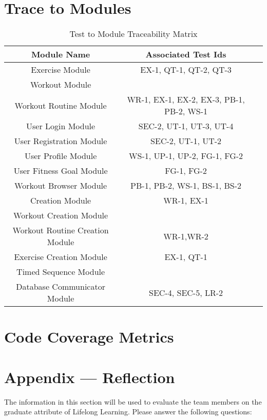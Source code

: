 \documentclass[12pt, titlepage]{article}
\begin{document}
\section{Trace to Modules}		
\begin{table}[H]
	\begin{tabular}{|c|c|c|}
		\hline
		\textbf{Module Name} & \textbf{Associated Test Ids}\\ \hline
		Exercise Module & EX-1, QT-1, QT-2, QT-3  \\\hline
		Workout Module & \\\hline
		Workout Routine Module & WR-1, EX-1, EX-2, EX-3, PB-1, PB-2, WS-1\\\hline
		User Login Module & SEC-2, UT-1, UT-3, UT-4 \\\hline
		User Registration Module & SEC-2, UT-1, UT-2\\\hline
		User Profile Module & WS-1, UP-1, UP-2, FG-1, FG-2\\\hline
		User Fitness Goal Module & FG-1, FG-2\\\hline
		Workout Browser Module & PB-1, PB-2, WS-1, BS-1, BS-2\\\hline
		Creation Module & WR-1, EX-1 \\\hline
		Workout Creation Module & \\\hline
		Workout Routine Creation Module & WR-1,WR-2\\\hline
		Exercise Creation Module & EX-1, QT-1\\\hline
		Timed Sequence Module & \\\hline
		Database Communicator Module & SEC-4, SEC-5, LR-2\\\hline
		
	\end{tabular}
	\caption{Test to Module Traceability Matrix}
	\label{Table:R_trace}
\end{table}
\section{Code Coverage Metrics}



\newpage{}
\section*{Appendix --- Reflection}

The information in this section will be used to evaluate the team members on the
graduate attribute of Lifelong Learning.  Please answer the following questions:
\end{document}
